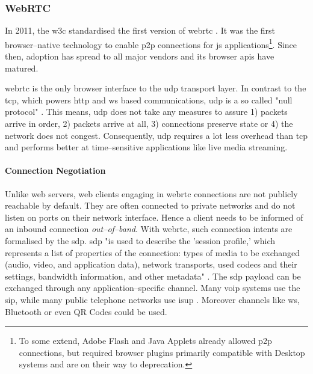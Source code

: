 \subsubsection{WebRTC}\label{sec:webrtc}

In 2011, the \gls{w3c} standardised the first version of \gls{webrtc} \cite{webrtc-w3c}. It was the first browser–native technology to enable \gls{p2p} connections for \gls{js} applications\footnote{To some extend, Adobe Flash and Java Applets already allowed \gls{p2p} connections, but required browser plugins primarily compatible with Desktop systems and are on their way to deprecation.}. Since then, adoption has spread to all major vendors \cite{webrtc-browser-compat} and its browser \glspl{api} have matured.

\gls{webrtc} is the only browser interface to the \gls{udp} transport layer. In contrast to the \gls{tcp}, which powers \gls{http} and \gls{ws} based communications, \gls{udp} is a so called "null protocol" \cite[p. 36]{high-performance-browser-networking}. This means, \gls{udp} does not take any measures to assure 1) packets arrive in order, 2) packets arrive at all, 3) connections preserve state or 4) the network does not congest. Consequently, \gls{udp} requires a lot less overhead than \gls{tcp} and performs better at time–sensitive applications like live media streaming.

\paragraph{Connection Negotiation}\label{par:webrtc-con-negotiation}
Unlike web servers, web clients engaging in \gls{webrtc} connections are not publicly reachable by default. They are often connected to private networks and do not listen on ports on their network interface.
Hence a client needs to be informed of an inbound connection \textit{out–of–band}. With \gls{webrtc}, such connection intents are formalised by the \gls{sdp}. \gls{sdp} "is used to describe the 'session profile,' which represents a list of properties of the connection: types of media to be exchanged (audio, video, and application data), network transports, used codecs and their settings, bandwidth information, and other metadata" \cite[p. 323]{high-performance-browser-networking}.
The \gls{sdp} payload \cite[\S5]{sdp-rfc} can be exchanged through any application–specific channel. Many \gls{voip} systems use the \gls{sip}, while many public telephone networks use \gls{isup} \cite[p. 321]{high-performance-browser-networking}. Moreover channels like \gls{ws}, Bluetooth or even QR Codes could be used.

